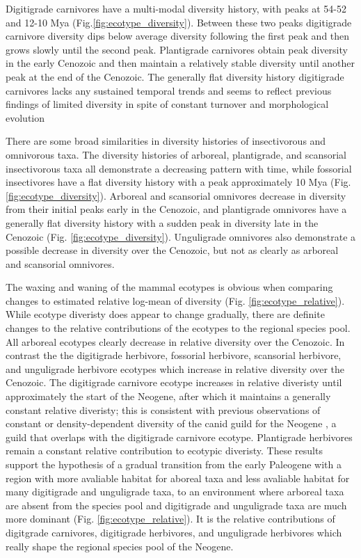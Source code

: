 \documentclass[12pt,letterpaper]{article}
\begin{document}
Digitigrade carnivores have a multi-modal diversity history, with peaks at 54-52 and 12-10 Mya (Fig.\ref{fig:ecotype_diversity}). Between these two peaks digitigrade carnivore diversity dips below average diversity following the first peak and then grows slowly until the second peak. Plantigrade carnivores obtain peak diversity in the early Cenozoic and then maintain a relatively stable diversity until another peak at the end of the Cenozoic. The generally flat diversity history digitigrade carnivores lacks any sustained temporal trends and seems to reflect previous findings of limited diversity in spite of constant turnover and morphological evolution \citep{Valkenburgh1999,Silvestro2015b,Slater2015c}

There are some broad similarities in diversity histories of insectivorous and omnivorous taxa. The diversity histories of arboreal, plantigrade, and scansorial insectivorous taxa all demonstrate a decreasing pattern with time, while fossorial insectivores have a flat diversity history with a peak approximately 10 Mya (Fig. \ref{fig:ecotype_diversity}). Arboreal and scansorial omnivores decrease in diversity from their initial peaks early in the Cenozoic, and plantigrade omnivores have a generally flat diversity history with a sudden peak in diversity late in the Cenozoic (Fig. \ref{fig:ecotype_diversity}). Unguligrade omnivores also demonstrate a possible decrease in diversity over the Cenozoic, but not as clearly as arboreal and scansorial omnivores.


The waxing and waning of the mammal ecotypes is obvious when comparing changes to estimated relative log-mean of diversity (Fig. \ref{fig:ecotype_relative}). While ecotype diveristy does appear to change gradually, there are definite changes to the relative contributions of the ecotypes to the regional species pool. All arboreal ecotypes clearly decrease in relative diversity over the Cenozoic. In contrast the the digitigrade herbivore, fossorial herbivore, scansorial herbivore, and unguligrade herbivore ecotypes which increase in relative diversity over the Cenozoic. The digitigrade carnivore ecotype increases in relative diveristy until approximately the start of the Neogene, after which it maintains a generally constant relative diveristy; this is consistent with previous observations of constant or density-dependent diversity of the canid guild for the Neogene \citep{Valkenburgh1999,Silvestro2015b,Slater2015c}, a guild that overlaps with the digitigrade carnivore ecotype. Plantigrade herbivores remain a constant relative contribution to ecotypic diveristy. These results support the hypothesis of a gradual transition from the early Paleogene with a region with more avaliable habitat for aboreal taxa and less avaliable habitat for many digitigrade and unguligrade taxa, to an environment where arboreal taxa are absent from the species pool and digitigrade and unguligrade taxa are much more dominant (Fig. \ref{fig:ecotype_relative}). It is the relative contributions of digitgrade carnivores, digitigrade herbivores, and unguligrade herbivores which really shape the regional species pool of the Neogene. 
\end{document}
